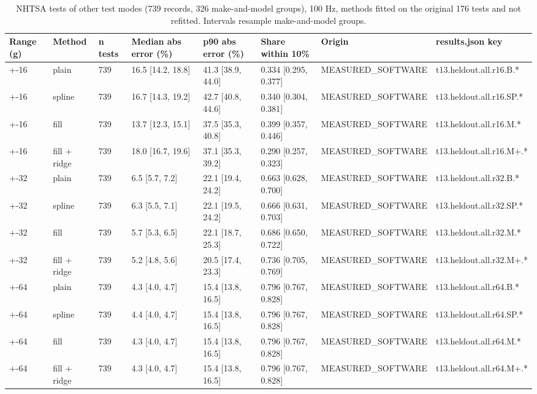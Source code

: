 \begin{table}[t]
\centering
\small
\caption{NHTSA tests of other test modes (739 records, 326 make-and-model groups), 100 Hz, methods fitted on the original 176 tests and not refitted. Intervals resample make-and-model groups.}
\label{tab:jp_tab_t13_heldout}
\begin{tabular}{llllllll}
\toprule
Range (g) & Method & n tests & Median abs error (\%) & p90 abs error (\%) & Share within 10\% & Origin & results.json key \\
\midrule
+-16 & plain & 739 & 16.5 [14.2, 18.8] & 41.3 [38.9, 44.0] & 0.334 [0.295, 0.377] & MEASURED\_SOFTWARE & t13.heldout.all.r16.B.* \\
+-16 & spline & 739 & 16.7 [14.3, 19.2] & 42.7 [40.8, 44.6] & 0.340 [0.304, 0.381] & MEASURED\_SOFTWARE & t13.heldout.all.r16.SP.* \\
+-16 & fill & 739 & 13.7 [12.3, 15.1] & 37.5 [35.3, 40.8] & 0.399 [0.357, 0.446] & MEASURED\_SOFTWARE & t13.heldout.all.r16.M.* \\
+-16 & fill + ridge & 739 & 18.0 [16.7, 19.6] & 37.1 [35.3, 39.2] & 0.290 [0.257, 0.323] & MEASURED\_SOFTWARE & t13.heldout.all.r16.M+.* \\
+-32 & plain & 739 & 6.5 [5.7, 7.2] & 22.1 [19.4, 24.2] & 0.663 [0.628, 0.700] & MEASURED\_SOFTWARE & t13.heldout.all.r32.B.* \\
+-32 & spline & 739 & 6.3 [5.5, 7.1] & 22.1 [19.5, 24.2] & 0.666 [0.631, 0.703] & MEASURED\_SOFTWARE & t13.heldout.all.r32.SP.* \\
+-32 & fill & 739 & 5.7 [5.3, 6.5] & 22.1 [18.7, 25.3] & 0.686 [0.650, 0.722] & MEASURED\_SOFTWARE & t13.heldout.all.r32.M.* \\
+-32 & fill + ridge & 739 & 5.2 [4.8, 5.6] & 20.5 [17.4, 23.3] & 0.736 [0.705, 0.769] & MEASURED\_SOFTWARE & t13.heldout.all.r32.M+.* \\
+-64 & plain & 739 & 4.3 [4.0, 4.7] & 15.4 [13.8, 16.5] & 0.796 [0.767, 0.828] & MEASURED\_SOFTWARE & t13.heldout.all.r64.B.* \\
+-64 & spline & 739 & 4.4 [4.0, 4.7] & 15.4 [13.8, 16.5] & 0.796 [0.767, 0.828] & MEASURED\_SOFTWARE & t13.heldout.all.r64.SP.* \\
+-64 & fill & 739 & 4.3 [4.0, 4.7] & 15.4 [13.8, 16.5] & 0.796 [0.767, 0.828] & MEASURED\_SOFTWARE & t13.heldout.all.r64.M.* \\
+-64 & fill + ridge & 739 & 4.3 [4.0, 4.7] & 15.4 [13.8, 16.5] & 0.796 [0.767, 0.828] & MEASURED\_SOFTWARE & t13.heldout.all.r64.M+.* \\
\bottomrule
\end{tabular}
\end{table}
